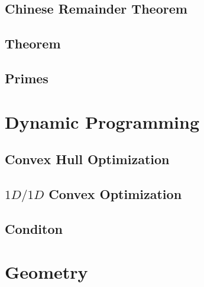 \documentclass[a4paper,10pt,twocolumn,oneside]{article}
\begin{document}
\subsection{Chinese Remainder Theorem}

% 
% 
% 
\subsection{Theorem}

\subsection{Primes}

\section{Dynamic Programming}
% 
\subsection{Convex Hull Optimization}

\subsection{$1D/1D$ Convex Optimization}

\subsection{Conditon}

\section{Geometry}
\end{document}
